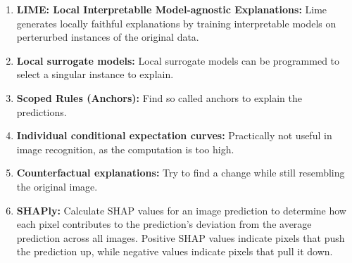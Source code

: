 \begin{enumerate}
	\item \textbf{LIME: Local Interpretablle Model-agnostic Explanations:} Lime generates locally faithful explanations by training interpretable models on perterurbed instances of the original data.
	\item \textbf{Local surrogate models:} Local surrogate models can be programmed to select a singular instance to explain.
	\item \textbf{Scoped Rules (Anchors):} Find so called anchors to explain the predictions.
	\item \textbf{Individual conditional expectation curves:} Practically not useful in image recognition, as the computation is too high.
	\item \textbf{Counterfactual explanations:} Try to find a change while still resembling the original image.
	\item \textbf{SHAPly:} Calculate SHAP values for an image prediction to determine how each pixel contributes to the prediction's deviation from the average prediction across all images.
	Positive SHAP values indicate pixels that push the prediction up, while negative values indicate pixels that pull it down.
\end{enumerate}



